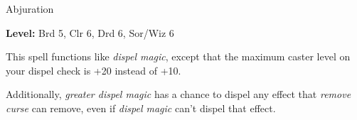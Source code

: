 \label{spell:Greater Dispel Magic}

Abjuration

\textbf{Level:} Brd 5, Clr 6, Drd 6, Sor/Wiz 6

This spell functions like \textit{dispel magic}, except that the maximum caster 
level on your dispel check is +20 instead of +10.

Additionally, \textit{greater dispel magic} has a chance to dispel any effect that 
\textit{remove curse} can remove, even if \textit{dispel magic} can't dispel that 
effect.

